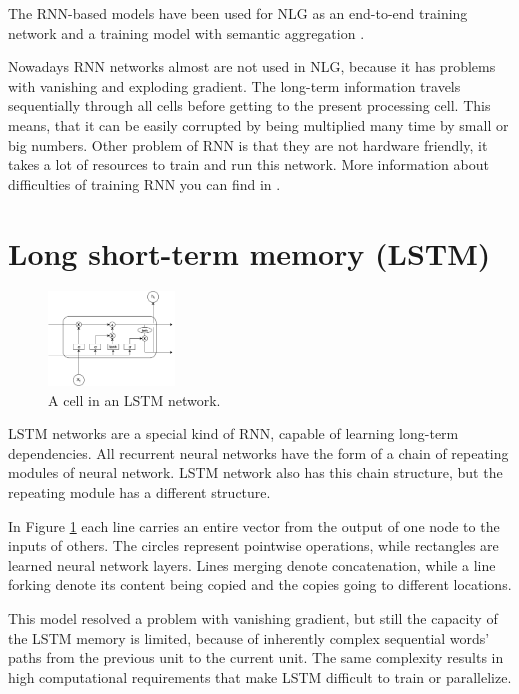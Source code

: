 The RNN-based models have been used for NLG as an end-to-end training network \cite{network_nlg} and a training model with semantic aggregation \cite{rnn_nlg}. 

Nowadays RNN networks almost are not used in NLG, because it has problems with vanishing and exploding gradient. The long-term information travels sequentially  through all cells before getting to the present processing cell. This means, that it can be easily corrupted by being multiplied many time by small or big numbers. Other problem of RNN is that they are not hardware friendly, it takes a lot of resources to train and run this network. More information about difficulties of training RNN you can find in \cite{rnn_difficulties}.


\section{Long short-term memory (LSTM)} 

\begin{figure}[hbt]
  \centering
  \includegraphics[width=0.3\textwidth]{figures/lstmCell.pdf}
  \caption{A cell in an LSTM network.}
  \label{lstm}
\end{figure}

LSTM networks are a special kind of RNN, capable of learning long-term dependencies. All recurrent neural networks have the form of a chain of repeating modules of neural network. LSTM network also has this chain structure, but the repeating module has a different structure. 

In Figure \ref{lstm} each line carries an entire vector from the output of one node to the inputs of others. The circles represent pointwise operations, while rectangles are learned neural network layers. Lines merging denote concatenation, while a line forking denote its content being copied and the copies going to different locations.

This model resolved a problem with vanishing gradient, but still the capacity of the LSTM memory is limited, because of inherently complex sequential words' paths from the previous unit to the current unit. The same complexity results in high computational requirements that make LSTM difficult to train or parallelize.

